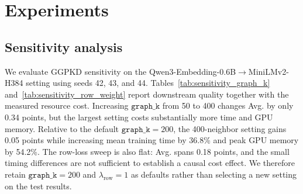 \section{Experiments}
\label{sec:experiments}


\clearpage

\subsection{Sensitivity analysis}
\label{sec:sensitivity}

We evaluate GGPKD sensitivity on the
Qwen3-Embedding-0.6B$\rightarrow$MiniLMv2-H384 setting using seeds 42, 43,
and 44. Tables~\ref{tab:sensitivity_graph_k}
and~\ref{tab:sensitivity_row_weight} report downstream quality together with
the measured resource cost. Increasing $\texttt{graph\_k}$ from 50 to 400
changes Avg. by only 0.34 points, but the largest setting costs substantially
more time and GPU memory. Relative to the default $\texttt{graph\_k}=200$, the
400-neighbor setting gains 0.05 points while increasing mean training time by
36.8\% and peak GPU memory by 54.2\%. The row-loss sweep is also flat: Avg.
spans 0.18 points, and the small timing differences are not sufficient to
establish a causal cost effect. We therefore retain
$\texttt{graph\_k}=200$ and $\lambda_{\mathrm{row}}=1$ as defaults rather than
selecting a new setting on the test results.



